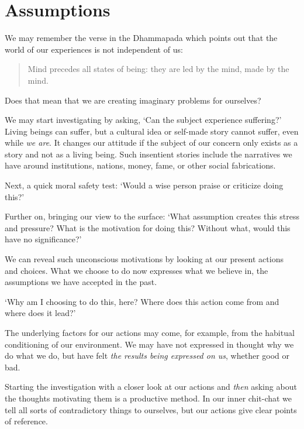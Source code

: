 \clearpage

\section{Assumptions}


\noindent We may remember the verse in the Dhammapada which points out
that the world of our experiences is not independent of us:

\begin{quote}
Mind precedes all states of being: they are led by the mind, made by the
mind.

\end{quote}

Does that mean that we are creating imaginary problems for ourselves?

We may start investigating by asking, `Can the subject experience
suffering?' Living beings can suffer, but a cultural idea or self-made
story cannot suffer, even while \emph{we are}. It changes our attitude
if the subject of our concern only exists as a story and not as a living
being. Such insentient stories include the narratives we have around
institutions, nations, money, fame, or other social fabrications.

Next, a quick moral safety test: `Would a wise person praise or
criticize doing this?'

Further on, bringing our view to the surface: `What assumption creates
this stress and pressure? What is the motivation for doing this? Without
what, would this have no significance?'

We can reveal such unconscious motivations by looking at our present
actions and choices. What we choose to do now expresses what we believe
in, the assumptions we have accepted in the past.

`Why am I choosing to do this, here? Where does this action come from
and where does it lead?'

The underlying factors for our actions may come, for example, from the
habitual conditioning of our environment. We may have not expressed in
thought why we do what we do, but have felt \emph{the results being
expressed on us}, whether good or bad.

Starting the investigation with a closer look at our actions and
\emph{then} asking about the thoughts motivating them is a productive
method. In our inner chit-chat we tell all sorts of contradictory things
to ourselves, but our actions give clear points of reference.

